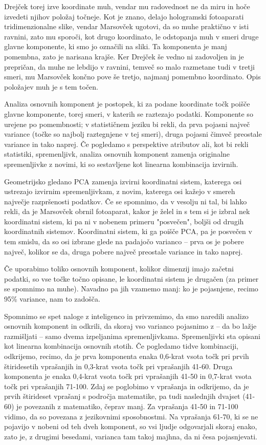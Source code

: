 Drejček torej izve koordinate muh, vendar mu radovednost ne da miru in hoče izvedeti njihov položaj točneje. Kot je znano, delajo hologramski fotoaparati tridimenzionalne slike, vendar Marsovček ugotovi, da so muhe praktično v isti ravnini, zato mu sporoči, kot drugo koordinato, le odstopanja muh v smeri druge glavne komponente, ki smo jo označili na sliki. Ta komponenta je manj pomembna, zato je narisana krajše. Ker Drejček še vedno ni zadovoljen in je prepričan, da muhe ne lebdijo v ravnini, temveč so malo razmetane tudi v tretji smeri, mu Marsovček končno pove še tretjo, najmanj pomembno koordinato. Opis položajev muh je s tem točen.

Analiza osnovnih komponent je postopek, ki za podane koordinate točk poišče glavne komponente, torej smeri, v katerih se raztezajo podatki. Komponente so urejene po pomembnosti; v statističnem jeziku bi rekli, da prva pojasni največ variance (točke so najbolj raztegnjene v tej smeri), druga pojasni čimveč preostale variance in tako naprej. Če pogledamo s perspektive atributov ali, kot bi rekli statistiki, spremenljivk, analiza osnovnih komponent zamenja originalne spremenljivke z novimi, ki so sestavljene kot linearna kombinacija izvirnih.

Geometrijsko gledano PCA zamenja izvirni koordinatni sistem, katerega osi ustrezajo izvirnim spremenljivkam, z novim, katerega osi kažejo v smereh največje razpršenosti podatkov. Če se spomnimo, da v vesolju ni tal, bi lahko rekli, da je Marsovček obrnil fotoaparat, kakor je želel in s tem si je izbral nek koordinatni sistem, ki pa ni v nobenem primeru "posvečen", boljši od drugih koordinatnih sistemov. Koordinatni sistem, ki ga poišče PCA, pa je posvečen v tem smislu, da so osi izbrane glede na padajočo varianco -- prva os je pobere največ, kolikor se da, druga pobere največ preostale variance in tako naprej.

Če uporabimo toliko osnovnih komponent, kolikor dimenzij imajo začetni podatki, so vse točke točno opisane, le koordinatni sistem je drugačen (za primer se spomnimo na muhe). Navadno pa jih vzamemo manj: ko je pojasnjene, recimo 95\% variance, nam to zadošča.

Spomnimo se spet naloge z inteligenco in privzemimo, da smo naredili analizo osnovnih komponent in odkrili, da skoraj vso varianco pojasnimo z -- da bo lažje razmišljati -- samo dvema izpeljanima spremenljivkama. Spremenljivki sta opisani kot linearna kombinacija osnovnih stotih. Če pogledamo tidve kombinaciji, odkrijemo, recimo, da je prva komponenta enaka 0,6-krat vsota točk pri prvih štiridesetih vprašanjih in 0,3-krat vsota točk pri vprašanjih 41-60. Druga komponenta je enaka 0,4-krat vsota točk pri vprašanjih 41-50 in 0,7-krat vsota točk pri vprašanjih 71-100. Zdaj se poglobimo v vprašanja in odkrijemo, da je prvih štirideset vprašanj s področja matematike, pa tudi naslednjih dvajset (41-60) je povezanih z matematiko, čeprav manj. Za vprašanja 41-50 in 71-100 vidimo, da so povezana z jezikovnimi sposobnostmi. Na vprašanja 61-70, ki se ne pojavijo v nobeni od teh dveh komponent, so vsi ljudje odgovarjali skoraj enako, zato je, z drugimi besedami, varianca tam takoj majhna, da ni česa pojasnjevati.

